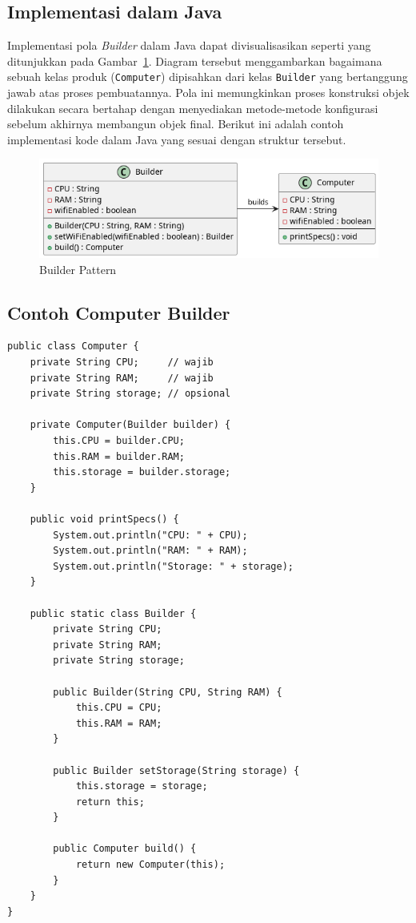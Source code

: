 \subsection{Implementasi dalam Java}

Implementasi pola \textit{Builder} dalam Java dapat divisualisasikan seperti yang ditunjukkan pada Gambar~\ref{fig:builder}. Diagram tersebut menggambarkan bagaimana sebuah kelas produk (\texttt{Computer}) dipisahkan dari kelas \texttt{Builder} yang bertanggung jawab atas proses pembuatannya. Pola ini memungkinkan proses konstruksi objek dilakukan secara bertahap dengan menyediakan metode-metode konfigurasi sebelum akhirnya membangun objek final. Berikut ini adalah contoh implementasi kode dalam Java yang sesuai dengan struktur tersebut.

\begin{figure}[h]
 	\centering
 	\includegraphics[width=.9\textwidth]{../figures/out/builder.png}
 	\caption{Builder Pattern}
 	\label{fig:builder}
\end{figure}


\subsection{Contoh Computer Builder}

\begin{lstlisting}[style=JavaStyle, caption={Implementasi Builder pada Kelas Computer}, label={lst:builder-computer}]
public class Computer {
	private String CPU;     // wajib
	private String RAM;     // wajib
	private String storage; // opsional
	
	private Computer(Builder builder) {
		this.CPU = builder.CPU;
		this.RAM = builder.RAM;
		this.storage = builder.storage;
	}
	
	public void printSpecs() {
		System.out.println("CPU: " + CPU);
		System.out.println("RAM: " + RAM);
		System.out.println("Storage: " + storage);
	}
	
	public static class Builder {
		private String CPU;
		private String RAM;
		private String storage;
		
		public Builder(String CPU, String RAM) {
			this.CPU = CPU;
			this.RAM = RAM;
		}
		
		public Builder setStorage(String storage) {
			this.storage = storage;
			return this;
		}
		
		public Computer build() {
			return new Computer(this);
		}
	}
}
\end{lstlisting}

